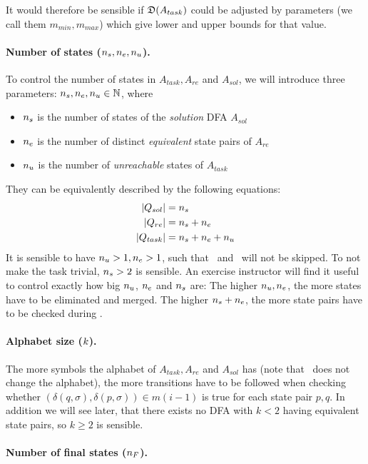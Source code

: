 It would therefore be sensible if $\mathfrak{D}(A_{task})$ could be adjusted by parameters (we call them $m_{min}, m_{max}$) which give lower and upper bounds for that value.

\paragraph*{Number of states \texorpdfstring{(${n_s}, {n_e}, {n_u}$)}{}.}

To control the number of states in $A_{task}, A_{re}$ and $A_{sol}$, we will introduce three parameters: ${n_s}, {n_e}, {n_u} \in \mathbb{N}$, where
\begin{itemize}
	\item ${n_s}$ is the number of states of the \emph{solution} DFA $A_{sol}$
	\item ${n_e}$ is the number of distinct \emph{equivalent} state pairs of $A_{re}$
	\item ${n_u}$ is the number of \emph{unreachable} states of $A_{task}$
\end{itemize}
They can be equivalently described by the following equations:
\begin{align*}
    |Q_{sol}| &= {n_s} \\
    |Q_{re}| &= {n_s} + {n_e} \\
    |Q_{task}| &= {n_s} + {n_e} + {n_u}
\end{align*}
It is sensible to have ${n_u} > 1, {n_e} > 1$, such that \RemUnr\ and \RemEq\ will not be skipped. To not make the task trivial, ${n_s} > 2$ is sensible. An exercise instructor will find it useful to control exactly how big ${n_u}$, ${n_e}$ and ${n_s}$ are: The higher ${n_u}, {n_e}$, the more states have to be eliminated and merged. The higher ${n_s} + {n_e}$, the more state pairs have to be checked during \CompDist.

\paragraph*{Alphabet size \texorpdfstring{($k$)}{}.}

The more symbols the alphabet of $A_{task}, A_{re}$ and $A_{sol}$ has (note that \MinAlg\ does not change the alphabet), the more transitions have to be followed when checking whether $(\delta(q,\sigma),\delta(p,\sigma))\in m(i-1)$ is true for each state pair $p,q$. In addition we will see later, that there exists no DFA with $k<2$ having equivalent state pairs, so $k\ge 2$ is sensible.

\paragraph*{Number of final states \texorpdfstring{(${n_F}$)}{}.}

